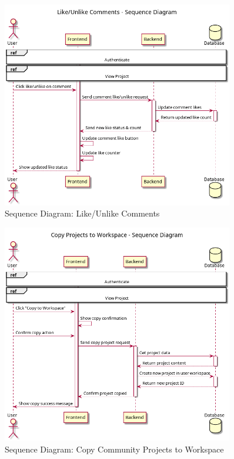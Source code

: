 \begin{figure}[H]
\centering
\includegraphics[width=0.9\textwidth]{conception/SprintV/sequence_diagrams/sequence_communityInteraction_6_8_LikeUnlikeComments.png}
\caption{Sequence Diagram: Like/Unlike Comments}
\label{fig:seq_like_comments}
\end{figure}

\begin{figure}[H]
\centering
\includegraphics[width=0.9\textwidth]{conception/SprintV/sequence_diagrams/sequence_communityInteraction_6_9_CopyCommunityProjectsToWorkspace.png}
\caption{Sequence Diagram: Copy Community Projects to Workspace}
\label{fig:seq_copy_projects}
\end{figure}

